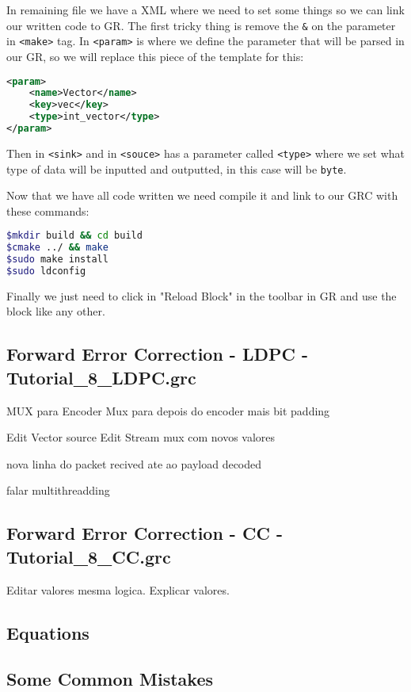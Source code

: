 \documentclass[a4paper, 10pt, conference]{ieeeconf}      %
\begin{document}
    In remaining file we have a XML where we need to set some things so we can link our written code to GR. The first tricky thing is remove the \verb|&| on the parameter in \verb|<make>| tag. 
    In \verb|<param>| is where we define the parameter that will be parsed in our GR, so we will replace this piece of the template for this:
\begin{lstlisting}[language=xml, breaklines]
<param>
    <name>Vector</name>
    <key>vec</key>
    <type>int_vector</type>
</param>
\end{lstlisting}
    Then in \verb|<sink>| and in \verb|<souce>| has a parameter called \verb|<type>| where we set what type of data will be inputted and outputted, in this case will be \verb|byte|.

    Now that we have all code written we need compile it and link to our GRC with these commands:
    
\begin{lstlisting}[language=bash, breaklines]
$mkdir build && cd build
$cmake ../ && make
$sudo make install
$sudo ldconfig
\end{lstlisting}
    
    Finally we just need to click in "Reload Block" in the toolbar in GR and use the block like any other.
\subsection{Forward Error Correction - LDPC - Tutorial\_8\_LDPC.grc}
MUX para Encoder
Mux para depois do encoder mais bit padding

Edit Vector source 
Edit Stream mux com novos valores

nova linha do packet recived ate ao payload decoded

falar multithreadding


\subsection{Forward Error Correction - CC - Tutorial\_8\_CC.grc}
Editar valores mesma logica. Explicar valores.

\subsection{Equations}
\subsection{Some Common Mistakes}
\end{document}
